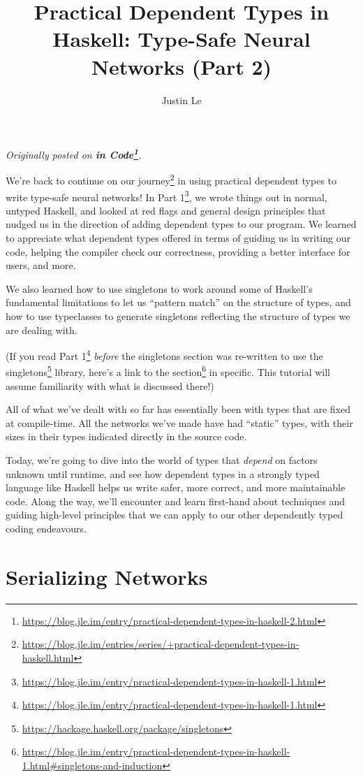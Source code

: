 \documentclass[]{article}
\title{Practical Dependent Types in Haskell: Type-Safe Neural Networks (Part 2)}
\author{Justin Le}
\renewcommand{\href}[2]{#2\footnote{\url{#1}}}
\begin{document}
\maketitle

\emph{Originally posted on
\textbf{\href{https://blog.jle.im/entry/practical-dependent-types-in-haskell-2.html}{in
Code}}.}

We're back to continue on
\href{https://blog.jle.im/entries/series/+practical-dependent-types-in-haskell.html}{our
journey} in using practical dependent types to write type-safe neural networks!
In
\href{https://blog.jle.im/entry/practical-dependent-types-in-haskell-1.html}{Part
1}, we wrote things out in normal, untyped Haskell, and looked at red flags and
general design principles that nudged us in the direction of adding dependent
types to our program. We learned to appreciate what dependent types offered in
terms of guiding us in writing our code, helping the compiler check our
correctness, providing a better interface for users, and more.

We also learned how to use singletons to work around some of Haskell's
fundamental limitations to let us ``pattern match'' on the structure of types,
and how to use typeclasses to generate singletons reflecting the structure of
types we are dealing with.

(If you read
\href{https://blog.jle.im/entry/practical-dependent-types-in-haskell-1.html}{Part
1} \emph{before} the singletons section was re-written to use the
\href{https://hackage.haskell.org/package/singletons}{singletons} library,
\href{https://blog.jle.im/entry/practical-dependent-types-in-haskell-1.html\#singletons-and-induction}{here's
a link to the section} in specific. This tutorial will assume familiarity with
what is discussed there!)

All of what we've dealt with so far has essentially been with types that are
fixed at compile-time. All the networks we've made have had ``static'' types,
with their sizes in their types indicated directly in the source code.

Today, we're going to dive into the world of types that \emph{depend} on factors
unknown until runtime, and see how dependent types in a strongly typed language
like Haskell helps us write safer, more correct, and more maintainable code.
Along the way, we'll encounter and learn first-hand about techniques and guiding
high-level principles that we can apply to our other dependently typed coding
endeavours.

\section{Serializing Networks}\label{serializing-networks}
\end{document}
